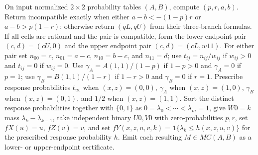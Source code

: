 On input normalized \(2\times2\) probability tables \((A,B)\), compute \((p,r,a,b)\).  Return incompatible exactly when either \(a-b<-(1-p)r\) or \(a-b>p(1-r)\); otherwise return \((qL,qU)\) from their three-branch formulas.  If all cells are rational and the pair is compatible, form the lower endpoint pair \((c,d)=(cU,0)\) and the upper endpoint pair \((c,d)=(cL,w11)\).  For either pair set \(n_{00}=c\), \(n_{01}=a-c\), \(n_{10}=b-c\), and \(n_{11}=d\); use \(t_{ij}=n_{ij}/w_{ij}\) if \(w_{ij}>0\) and \(t_{ij}=0\) if \(w_{ij}=0\).  Use \(\gamma_A=A(1,1)/(1-p)\) if \(1-p>0\) and \(\gamma_A=0\) if \(p=1\); use \(\gamma_B=B(1,1)/(1-r)\) if \(1-r>0\) and \(\gamma_B=0\) if \(r=1\).  Prescribe response probabilities \(t_{uv}\) when \((x,z)=(0,0)\), \(\gamma_A\) when \((x,z)=(1,0)\), \(\gamma_B\) when \((x,z)=(0,1)\), and \(1/2\) when \((x,z)=(1,1)\).  Sort the distinct response probabilities together with \(\{0,1\}\) as \(0=\lambda_0<\cdots<\lambda_m=1\), give \(W0=k\) mass \(\lambda_k-\lambda_{k-1}\), take independent binary \(U0,V0\) with zero-probabilities \(p,r\), set \(fX(u)=u\), \(fZ(v)=v\), and set \(fY(x,z,u,v,k)=\mathbf 1\{\lambda_k\le h(x,z,u,v)\}\) for the prescribed response probability \(h\).  Emit each resulting \(M\in MC(A,B)\) as a lower- or upper-endpoint certificate.
